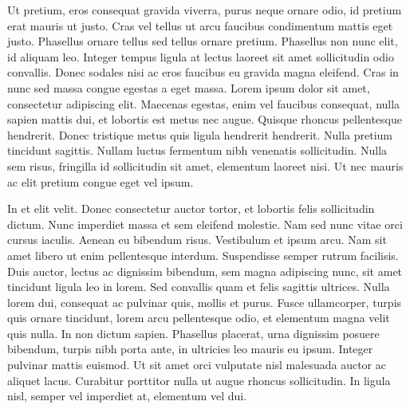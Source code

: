 Ut pretium, eros consequat gravida viverra, purus neque ornare odio, id
pretium erat mauris ut justo. Cras vel tellus ut arcu faucibus condimentum
mattis eget justo. Phasellus ornare tellus sed tellus ornare pretium.
Phasellus non nunc elit, id aliquam leo. Integer tempus ligula at lectus
laoreet sit amet sollicitudin odio convallis. Donec sodales nisi ac eros
faucibus eu gravida magna eleifend. Cras in nunc sed massa congue egestas a
eget massa. Lorem ipsum dolor sit amet, consectetur adipiscing elit. Maecenas
egestas, enim vel faucibus consequat, nulla sapien mattis dui, et lobortis est
metus nec augue. Quisque rhoncus pellentesque hendrerit. Donec tristique metus
quis ligula hendrerit hendrerit. Nulla pretium tincidunt sagittis. Nullam
luctus fermentum nibh venenatis sollicitudin. Nulla sem risus, fringilla id
sollicitudin sit amet, elementum laoreet nisi. Ut nec mauris ac elit pretium
congue eget vel ipsum.

In et elit velit. Donec consectetur auctor tortor, et lobortis felis
sollicitudin dictum. Nunc imperdiet massa et sem eleifend molestie. Nam sed
nunc vitae orci cursus iaculis. Aenean eu bibendum risus. Vestibulum et ipsum
arcu. Nam sit amet libero ut enim pellentesque interdum. Suspendisse semper
rutrum facilisis. Duis auctor, lectus ac dignissim bibendum, sem magna
adipiscing nunc, sit amet tincidunt ligula leo in lorem. Sed convallis quam et
felis sagittis ultrices. Nulla lorem dui, consequat ac pulvinar quis, mollis
et purus. Fusce ullamcorper, turpis quis ornare tincidunt, lorem arcu
pellentesque odio, et elementum magna velit quis nulla. In non dictum sapien.
Phasellus placerat, urna dignissim posuere bibendum, turpis nibh porta ante,
in ultricies leo mauris eu ipsum. Integer pulvinar mattis euismod. Ut sit amet
orci vulputate nisl malesuada auctor ac aliquet lacus. Curabitur porttitor
nulla ut augue rhoncus sollicitudin. In ligula nisl, semper vel imperdiet at,
elementum vel dui.
